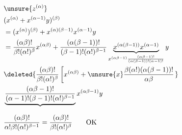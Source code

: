 \[
\begin{aligned}
 &\unsure{z^{(\alpha)}}\\
 &(x^{(\alpha)}+x^{(\alpha-1)}y)^{(\beta)}\\
 &= (x^{(\alpha)})^{(\beta)}+x^{(\alpha)(\beta-1)}x^{(\alpha-1)}y\\
 &=\frac{(\alpha\beta)!}{\beta!(\alpha!)^\beta}x^{(\alpha\beta)}
  +\frac{(\alpha(\beta-1))!}{(\beta-1)!(\alpha!)^{\beta-1}}
 \underbrace{x^{(\alpha(\beta-1))}x^{(\alpha-1)}}_{x^{(\alpha\beta-1)}
 \frac{(\alpha\beta-1)!}{(\alpha(\beta-1))!(\alpha-1)!}}y\\
 &\deleted{\frac{(\alpha\beta)!}{\beta!(\alpha!)^\beta}
 \left[x^{(\alpha\beta)}+\unsure{x}\frac{\beta(\alpha!)(\alpha(\beta-1))!}{\alpha\beta}\right.}\\
 &\underbrace{\frac{(\alpha\beta-1)!}{(\alpha-1)!(\beta-1)!(\alpha!)^{\beta-1}}}_{}
 x^{(\alpha\beta-1)}y\\
 &\frac{(\alpha\beta)!}{\alpha!\beta!(\alpha!)^{\beta-1}}=\frac{(\alpha\beta)!}{\beta!(\alpha!)^\beta}\qquad\text{OK}
\end{aligned}
\]

\deleted{\[
\begin{aligned}
 x^{(p)}x^{(q)}&=\frac{(p+q)!}{p!q!}x^{(p+q)}\\
 z^{(p)}z^{(q)}&\overset{?}{=}\frac{(p+q)!}{p!q!}z^{(p+q)}\\
 &=(x^{(p)}+x^{(p-1)}y)(x^{(q)}+x^{(q-1)}y)\\
 &=\underbrace{x^{(p)}x^{(q)}}_{}+(\deleted{\unsure{x}}x^{(p)}x^{(q-1)}+x^{(p-1)}x^{(q)})y\\
 &=\frac{(p+q)!}{p!q!}\unsure{x^{(p+q)}}+
 \underbrace{\left(\frac{((p+q-1))!}{p!(q-1)!}+\frac{(p+q-1)!}{(p-1)!q!}\right)}_{}x^{(p+q+1)}y\\
 &(p+q-1)!\frac{p+q}{p!q!}=\frac{(p+q)!}{p!q!}\quad\text{OK}
\end{aligned}
\]}

